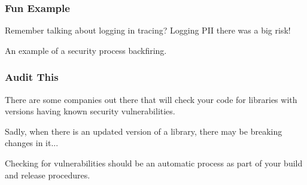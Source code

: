 \begin{frame}
\frametitle{Fun Example}

Remember talking about logging in tracing? Logging PII there was a big risk!

An example of a security process backfiring.


\end{frame}



\begin{frame}
\frametitle{Audit This}

There are some companies out there that will check your code for libraries with versions having known security vulnerabilities.

Sadly, when there is an updated version of a library, there may be breaking changes in it...

Checking for vulnerabilities should be an automatic process as part of your build and release procedures. 

\end{frame}




